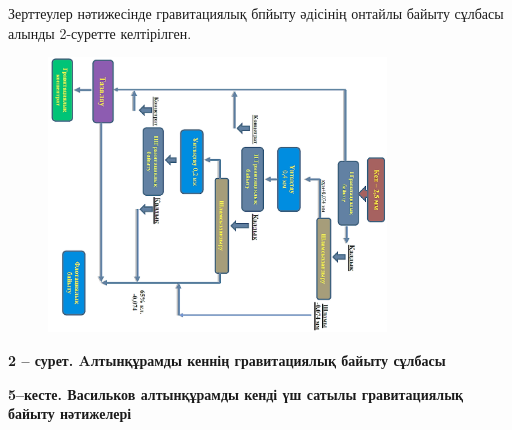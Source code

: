 
Зерттеулер нәтижесінде гравитациялық бпйыту әдісінің онтайлы байыту
сұлбасы алынды 2-суретте келтірілген.

\begin{figure}[H]
	\centering
	\includegraphics[width=0.8\textwidth]{media/gor/image4}
	\caption*{}
\end{figure}


{\bfseries 2 -- сурет. Aлтынқұрамды кеннің гравитациялық байыту сұлбасы}

{\bfseries 5--кесте. Васильков алтынқұрамды кенді үш сатылы гравитациялық
байыту нәтижелері}

